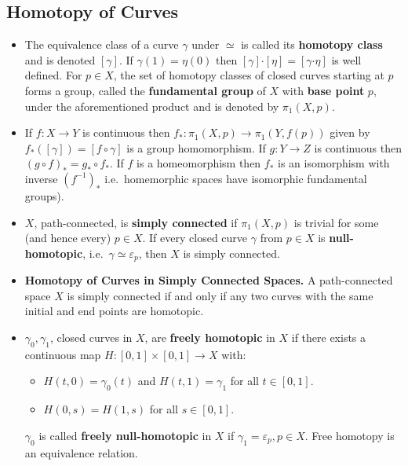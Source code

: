 \documentclass{article}
\newenvironment{topic}[1]{%
{\subsection{#1}}%
\begin{itemize}%
}{%
\end{itemize}%
}
\newcommand{\theorem}[1]{\item {\bf #1.}}
\newcommand{\term}[1]{{\bf #1}}
\newcommand{\remark}{\item}
\newcommand{\curveproduct}{\boldsymbol{\cdot}}
\begin{document}
\begin{topic}{Homotopy of Curves}
\remark The equivalence class of a curve $\gamma$ under $\simeq$ is called its \term{homotopy class} and is denoted $[\gamma]$. If $\gamma(1) = \eta(0)$ then $[\gamma] \curveproduct [\eta] = [\gamma \curveproduct \eta]$ is well defined. For $p \in X$, the set of homotopy classes of closed curves starting at $p$ forms a group, called the \term{fundamental group} of $X$ with \term{base point} $p$, under the aforementioned product and is denoted by $\pi_1(X, p)$.

\remark If $f : X \to Y$ is continuous then $f_\ast : \pi_1(X, p) \to \pi_1(Y, f(p))$ given by $f_\ast([\gamma]) = [f \circ \gamma]$ is a group homomorphism. If $g : Y \to Z$ is continuous then $(g \circ f)_\ast = g_\ast \circ f_\ast$. If $f$ is a homeomorphism then $f_\ast$ is an isomorphism with inverse $(f^{-1})_\ast$ i.e.\ homemorphic spaces have isomorphic fundamental groups).

\remark $X$, path-connected, is \term{simply connected} if $\pi_1(X, p)$ is trivial for some (and hence every) $p \in X$. If every closed curve $\gamma$ from $p \in X$ is \term{null-homotopic}, i.e.\ $\gamma \simeq \varepsilon_p$, then $X$ is simply connected.

\theorem{Homotopy of Curves in Simply Connected Spaces} A path-connected space $X$ is simply connected if and only if any two curves with the same initial and end points are homotopic.

\remark $\gamma_0, \gamma_1$, closed curves in $X$, are \term{freely homotopic} in $X$ if there exists a continuous map $H : [0, 1] \times [0, 1] \to X$ with:
\begin{itemize}
\item $H(t, 0) = \gamma_0(t)$ and $H(t, 1) = \gamma_1$ for all $t \in [0, 1]$.
\item $H(0, s) = H(1, s)$ for all $s \in [0, 1]$.
\end{itemize}
$\gamma_0$ is called \term{freely null-homotopic} in $X$ if $\gamma_1 = \varepsilon_p, p \in X$. Free homotopy is an equivalence relation.

\end{topic}
\end{document}
